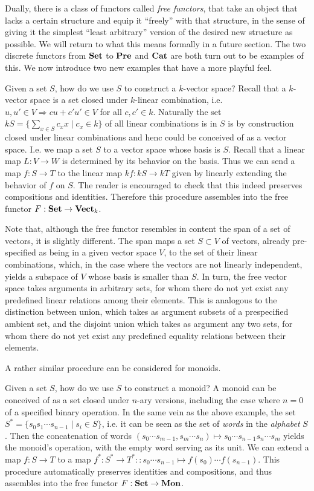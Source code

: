 Dually, there is a class of functors called \emph{free functors}, that take an object that lacks a certain structure and equip it ``freely'' with that structure, in the sense of giving it the simplest ``least arbitrary'' version of the desired new structure as possible. We will return to what this means formally in a future section. The two discrete functors from $\mathbf{Set}$ to $\mathbf{Pre}$ and $\mathbf{Cat}$ are both turn out to be examples of this. We now introduce two new examples that have a more playful feel.
\begin{ex}
Given a set $S$, how do we use $S$ to construct a $k$-vector space? Recall that a $k$-vector space is a set closed under $k$-linear combination, i.e. $u,u'\in V\Rightarrow cu+c'u'\in V$ for all $c,c'\in k$. Naturally the set $kS=\{\sum_{x\in S} c_xx\mid c_x\in k\}$ of all linear combinations is in $S$ is by construction closed under linear combinations and henc could be conceived of as a vector space. I.e. we map a set $S$ to a vector space whose basis is $S$. Recall that a linear map $L:V\to W$ is determined by its behavior on the basis. Thus we can send a map $f:S\to T$ to the linear map $kf : kS\to kT$ given by linearly extending the behavior of $f$ on $S$. The reader is encouraged to check that this indeed preserves compositions and identities. Therefore this procedure assembles into the free functor $F:\mathbf{Set}\to\mathbf{Vect}_k$.
\end{ex}
\begin{rem} Note that, although the free functor resembles in content the span of a set of vectors, it is slightly different. The span maps a set $S\subset V$ of vectors, already pre-specified as being in a given vector space $V$, to the set of their linear combinations, which, in the case where the vectors are not linearly independent, yields a subspace of $V$ whose basis is smaller than $S$. In turn, the free vector space takes arguments in arbitrary sets, for whom there do not yet exist any predefined linear relations among their elements. This is analogous to the distinction between union, which takes as argument subsets of a prespecified ambient set, and the disjoint union which takes as argument any two sets, for whom there do not yet exist any predefined equality relations between their elements.
\end{rem}

A rather similar procedure can be considered for monoids.

\begin{ex}
Given a set $S$, how do we use $S$ to construct a monoid? A monoid can be conceived of as a set closed under $n$-ary versions, including the case where $n=0$ of a specified binary operation. In the same vein as the above example, the set $S^*=\{s_0s_1\cdots s_{n-1}\mid s_i\in S\}$, i.e. it can be seen as the set of \emph{words} in the \emph{alphabet} $S$. Then the concatenation of words $(s_0\cdots s_{m-1},s_m\cdots s_n)\mapsto s_0\cdots s_{n-1}s_n\cdots s_m$ yields the monoid's operation, with the empty word serving as its unit. We can extend a map $f:S\to T$ to a map $f^*:S^*\to T^*::s_0\cdots s_{n-1}\mapsto f(s_0)\cdots f(s_{n-1})$. This procedure automatically preserves identities and compositions, and thus assembles into the free functor $F:\mathbf{Set}\to\mathbf{Mon}$.
\end{ex}

